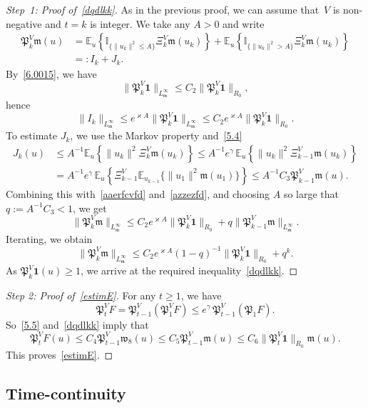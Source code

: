 \documentclass[AHL,Unicode,longabstracts]{cedram}
\newcommand{\mek}{{\mathbf 1}}
\newcommand{\I}{{\mathbb I}}
\newcommand{\E}{{\mathbb E}}
\newcommand{\vk}{{\varkappa}}
\newcommand{\wwww}{{\mathfrak w}}
\newcommand{\mm}{{\mathfrak m}}
\newcommand{\PPPP}{{\mathfrak P}}
\newenvironment{step}{\begin{proof}}{\let\qed\relax \end{proof}}
\begin{document}
\begin{proofc}

\begin{step}[Step~1: Proof of~\eqref{dqdlkk}]
As in the previous proof, we can assume that~$V$ is non-negative and $t=k$ is integer. We take any $A>0$ and write
\begin{align}\label{aaerfcvfd}
\PPPP_k^V\mm (u)&= \E_u \left\{ \I_{\{\|u_k\|^2\le A\}} \Xi_k^V\mm(u_k) \right\}+ \E_u \left\{ \I_{\{\|u_k\|^2> A\}} \Xi_k^V\mm(u_k) \right\}\nonumber\\& =:I_k+J_k.
\end{align}
By~\eqref{6.0015}, we have
\[
\|\PPPP_k^V{\mek}\|_{L_\mm^\infty} \le C_2 \|\PPPP_{k}^V{\mek}\|_{R_0},
\]
hence
\begin{equation}\label{azzezfd}
\|I_k\|_{L_\mm^\infty} \le e^{\vk A} \|\PPPP_k^V{\mek}\|_{L_\mm^\infty} \le C_2 e^{\vk A} \|\PPPP_{k}^V{\mek}\|_{R_0}.
\end{equation}
To estimate $J_k$, we use the Markov property and~\eqref{5.4}
\begin{align*}
J_k(u)&\le A ^{-1} \E_u \left\{ \|u_k\|^2 \Xi_k^V\mm(u_k) \right\} \le A ^{-1}e^{\gamma}\, \E_u \left\{ \|u_k\|^2 \Xi_{k-1}^V \mm(u_k) \right\}\\&=A ^{-1} e^{\gamma}\, \E_u \left\{ \Xi_{k-1}^V\E_{u_{k-1}}\Big\{ \|u_1\|^2 \mm(u_1)\Big\} \right\} \le A^{-1} C_3 \PPPP_{k-1}^V\mm (u).
\end{align*}
Combining this with~\eqref{aaerfcvfd} and~\eqref{azzezfd}, and choosing $A$ so large that $q:=A^{-1} C_3<1$, we get
\[
\|\PPPP_k^V\mm\|_{L_\mm^\infty} \le C_2 e^{\vk A} \|\PPPP_{k}^V{\mek}\|_{R_0}+ q \|\PPPP_{k-1}^V\mm\|_{L_\mm^\infty}.
\]
Iterating, we obtain
\[
\|\PPPP_k^V\mm\|_{L_\mm^\infty} \le C_2 e^{\vk A} (1-q)^{-1} \|\PPPP_{k}^V{\mek}\|_{R_0}+ q^k.
\]
As $\PPPP_{k}^V{\mek}(u)\ge1$, we arrive at the required inequality~\eqref{dqdlkk}.
\end{step}

\begin{proof}[Step 2: Proof of~\eqref{estimE}]
For any $ t\ge1$, we have
\[
\PPPP_t^VF=\PPPP_{t-1}^V(\PPPP_1^VF)\le e^{\gamma}\,\PPPP_{t-1}^V(\PPPP_1F).
\]
So~\eqref{5.5} and~\eqref{dqdlkk} imply that
\[
\PPPP_t^VF(u) \le C_4\PPPP_{t-1}^V\wwww_8(u)\le C_5\PPPP_{t-1}^V\mm(u) \le C_6 \|\PPPP_{t}^V{\mek}\|_{R_0}\mm(u).
\]
This proves~\eqref{estimE}.
\end{proof}
\let\qed\relax
\end{proofc}

\subsection{Time-continuity}
\end{document}
